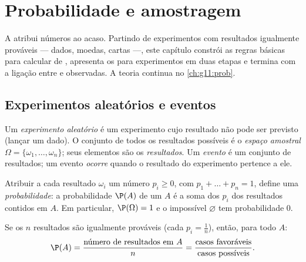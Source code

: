 \chapter{Probabilidade e amostragem}\label{ch:g10:proba}

A  atribui números ao acaso. Partindo de experimentos com
resultados igualmente prováveis --- dados, moedas, cartas ---, este
capítulo constrói as regras básicas para calcular  de
, apresenta os  para experimentos em duas
etapas e termina com a ligação entre  e 
observadas. A teoria continua no \cref{ch:g11:prob}.

\section{Experimentos aleatórios e eventos}

\begin{definition}\label{def:g10:proba:events}
Um \emph{experimento aleatório} é um
experimento cujo resultado não pode ser previsto (lançar um dado). O
conjunto de todos os resultados possíveis é o \emph{espaço
amostral} $\Omega = \{\omega_1, \dots,
\omega_n\}$; seus elementos são os \emph{resultados}. Um
\emph{evento} é um conjunto de resultados; um evento
\emph{ocorre} quando o resultado do experimento pertence a ele.
\end{definition}

\begin{definition}\label{def:g10:proba:distribution}
Atribuir a cada resultado $\omega_i$ um número $p_i \geq 0$, com
$p_1 + \dots + p_n = 1$, define uma
\emph{probabilidade}: a probabilidade $\P(A)$ de um
 $A$ é a soma dos $p_i$ dos resultados contidos em $A$. Em
particular, $\P(\Omega) = 1$ e o  impossível $\varnothing$ tem
probabilidade $0$.
\end{definition}

\begin{proposition}\label{prop:g10:proba:uniform}
Se os $n$ resultados são igualmente prováveis (cada $p_i = \frac1n$),
então, para todo  $A$:
\[
\P(A) = \frac{\text{número de resultados em } A}{n}
= \frac{\text{casos favoráveis}}{\text{casos possíveis}} .
\]
\end{proposition}

